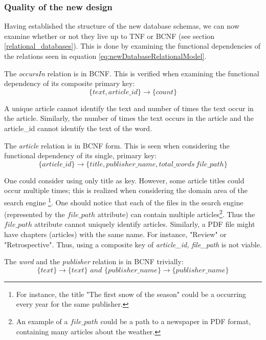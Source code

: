 \subsubsection*{Quality of the new design}
Having established the structure of the new database schemas, we can now examine whether or not they live up to TNF or BCNF (see section \ref{relational_databases}).
This is done by examining the functional dependencies of the relations seen in equation \ref{eq:newDatabaseRelationalModel}.

The \textit{occursIn} relation is in BCNF. 
This is verified when examining the functional dependency of its composite primary key:
\begin{equation*}
 \{text,article\_id\}\rightarrow \{count\}   
\end{equation*}

A unique article cannot identify the text and number of times the text occur in the article.
Similarly, the number of times the text occurs in the article and the article\_id cannot identify the text of the word.

The \textit{article} relation is in BCNF form. 
This is seen when considering the functional dependency of its single, primary key:
\begin{equation*}
    \{article\_id\} \rightarrow \{title, publisher\_name,total\_words\, file\_path\}
\end{equation*}

One could consider using only title as key. 
However, some article titles could occur multiple times; this is realized when considering the domain area of the \knox{} search engine
\footnote{For instance, the title "The first snow of the season" could be a occurring every year for the same publisher.}.
One should notice that each of the files in the search engine (represented by the $file\_path$ attribute) can contain multiple articles\footnote{An example of a $file\_path$ could be a path to a newspaper in PDF format, containing many articles about the weather.}.
Thus the $file\_path$ attribute cannot uniquely identify articles.
Similarly, a PDF file might have chapters (articles) with the same name. For instance, "Review" or "Retrospective".
Thus, using a composite key of \textit{article\_id, file\_path} is not viable. 

The \textit{word} and the \textit{publisher} relation is in BCNF trivially:
\begin{equation*}
    \{ text\} \rightarrow \{text\} \textit{\ and\ } \{ publisher\_name \} \rightarrow \{ publisher\_name\}
\end{equation*}

